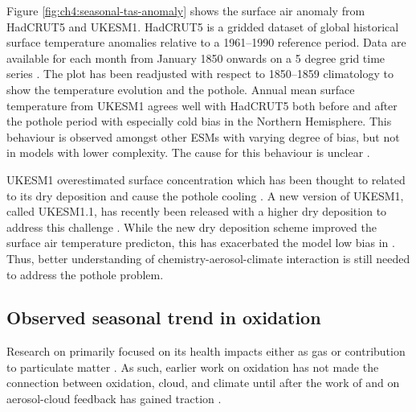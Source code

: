 Figure \ref{fig:ch4:seasonal-tas-anomaly} shows the surface air anomaly from HadCRUT5 and UKESM1.  HadCRUT5 is a gridded dataset of global historical surface temperature anomalies relative to a 1961--1990 reference period. Data are available for each month from January 1850 onwards on a 5 degree grid time series \citep{moriceUpdatedAssessmentSurface2021}. The plot has been readjusted with respect to 1850--1859 climatology to show the temperature evolution and the pothole. Annual mean surface temperature from UKESM1 agrees well with HadCRUT5 both before and after the pothole period with especially cold bias in the Northern Hemisphere. This behaviour is observed amongst other ESMs with varying degree of bias, but not in models with lower complexity. The cause for this behaviour is unclear \citep{zhangRoleAnthropogenicAerosols2021}.

UKESM1 overestimated surface  concentration which has been thought to related to its dry deposition and cause the pothole cooling \citep{hardacreEvaluationSO2SO422021}. A new version of UKESM1, called UKESM1.1, has recently been released with a higher  dry deposition to address this challenge \citep{mulcahyUKESM11DevelopmentEvaluation2023}. While the new dry deposition scheme improved the surface air temperature predicton, this has exacerbated the model low bias in . Thus, better understanding of chemistry-aerosol-climate interaction is still needed to address the pothole problem.

\subsection{Observed seasonal trend in  oxidation}
\label{ch4:seasonal-so2-oxidation-observation}

Research on  primarily focused on its health impacts either as  gas or contribution to particulate matter \citep[e.g. ][]{meagherSeasonalVariationAtmospheric1983,eatoughConversionSO2Sulfate1994, feichterSimulationTroposphericSulfur1996} . As such, earlier work on  oxidation has not made the connection between  oxidation, cloud, and climate until after the work of \citet{twomeyInfluencePollutionShortwave1977} and \citet{albrechtAerosolsCloudMicrophysics1989} on aerosol-cloud feedback has gained traction  .  

